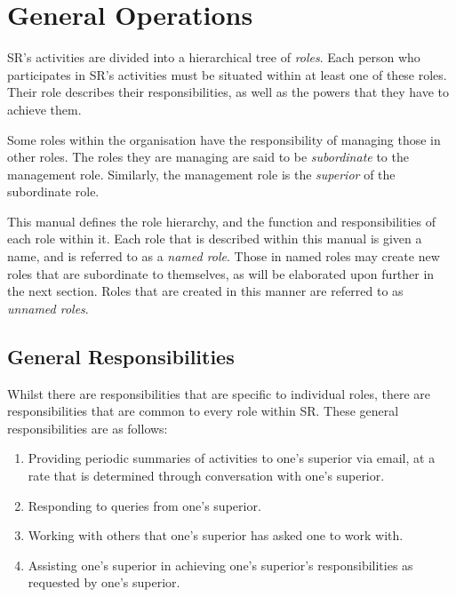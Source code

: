 \chapter{General Operations}

SR's activities are divided into a hierarchical tree of \textit{roles}.  Each person who participates in SR's activities must be situated within at least one of these roles.  Their role describes their responsibilities, as well as the powers that they have to achieve them.

Some roles within the organisation have the responsibility of managing those in other roles.  The roles they are managing are said to be \textit{subordinate} to the management role.  Similarly, the management role is the \textit{superior} of the subordinate role.

This manual defines the role hierarchy, and the function and responsibilities of each role within it.  Each role that is described within this manual is given a name, and is referred to as a \textit{named role}.  Those in named roles may create new roles that are subordinate to themselves, as will be elaborated upon further in the next section.  Roles that are created in this manner are referred to as \textit{unnamed roles}.

\section{General Responsibilities}

Whilst there are responsibilities that are specific to individual roles, there are responsibilities that are common to every role within SR.  These general responsibilities are as follows:

\begin{enumerate}
  \item Providing periodic summaries of activities to one's superior via email, at a rate that is determined through conversation with one's superior.

  \item Responding to queries from one's superior.

  \item Working with others that one's superior has asked one to work with.

  \item Assisting one's superior in achieving one's superior's responsibilities as requested by one's superior.
\end{enumerate}

